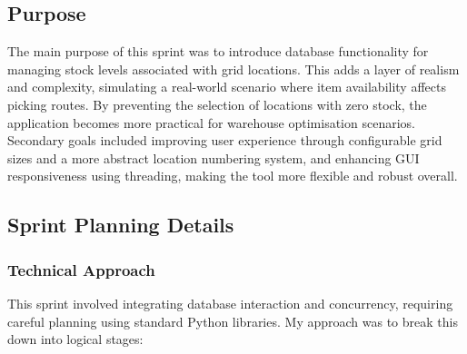 \subsection{Purpose}

The main purpose of this sprint was to introduce database functionality for managing stock levels associated with grid locations. This adds a layer of realism and complexity, simulating a real-world scenario where item availability affects picking routes. By preventing the selection of locations with zero stock, the application becomes more practical for warehouse optimisation scenarios. Secondary goals included improving user experience through configurable grid sizes and a more abstract location numbering system, and enhancing GUI responsiveness using threading, making the tool more flexible and robust overall.

\clearpage
\subsection{Sprint Planning Details}

\subsubsection{Technical Approach}

This sprint involved integrating database interaction and concurrency, requiring careful planning using standard Python libraries. My approach was to break this down into logical stages:

